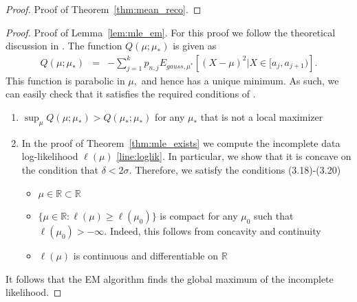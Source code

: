\documentclass[12pt]{article} %
\begin{document}
\begin{proof}{Proof of Theorem~\ref{thm:mean_reco}.}
\end{proof}

\bigskip

\noindent\begin{proof}{Proof of Lemma~\ref{lem:mle_em}.}
For this proof we follow the theoretical discussion in \citet{EMbook}.  The function $Q(\mu; \mu_*)$ is given as 
\begin{eqnarray*}
Q(\mu; \mu_*) &=& - \sum_{j=1}^k p_{n,j} E_{gauss, \mu^*}\left[(X-\mu)^2\vert X \in [a_j, a_{j+1})\right].
\end{eqnarray*}
This function is parabolic in $\mu,$ and hence has a unique minimum.   As such, we can easily check that it satisfies the required conditions of \citet{wu83}.   
\begin{enumerate}
\item $\sup_\mu Q(\mu; \mu_*) > Q(\mu_*; \mu_*)$ for any $\mu_*$ that is not a local maximizer
\item  In the proof of  Theorem~\ref{thm:mle_exists} we compute the incomplete data log-likelihood $\ell(\mu)$ \eqref{line:loglik}.   In particular, we show that it is concave on the condition that $\delta<2\sigma.$   Therefore, we satisfy the conditions (3.18)-(3.20) \citep[Section 3.4.2]{EMbook}
\begin{itemize}
\item $\mu \in \mathbb R \subset \mathbb R$
\item $\{\mu \in \mathbb R: \ell(\mu)\geq \ell(\mu_0)\}$ is compact for any $\mu_0$ such that $\ell(\mu_0)>-\infty.$  Indeed, this follows from concavity and continuity
\item $\ell(\mu)$ is continuous and differentiable on $\mathbb R$
\end{itemize}
\end{enumerate}
It follows that the EM algorithm finds the global maximum of the incomplete likelihood.
\end{proof}

\bigskip
\end{document}
